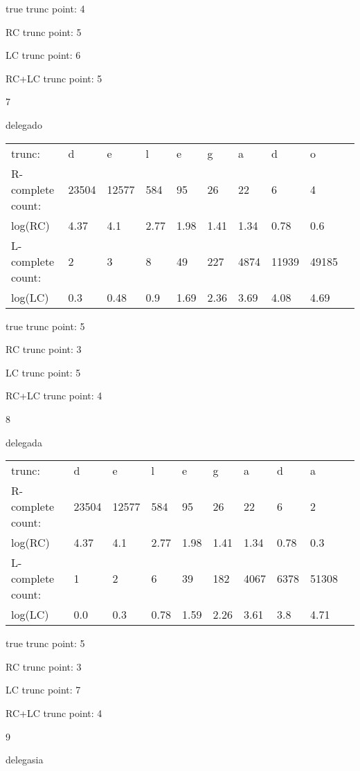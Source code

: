 \documentclass{article}
\begin{document}
true trunc point: 4

RC trunc point: 5

LC trunc point: 6

RC+LC trunc point: 5

\vspace{1em}

7

delegado

\begin{tabular}{l|lllllllll}
trunc: & d & e & l & e & g & a & d & o & \\ 
R-complete count: & 23504 & 12577 & 584 & 95 & 26 & 22 & 6 & 4 & \\ 
log(RC) & 4.37 & 4.1 & 2.77 & 1.98 & 1.41 & 1.34 & 0.78 & 0.6 & \\ 
L-complete count: & 2 & 3 & 8 & 49 & 227 & 4874 & 11939 & 49185 & \\ 
log(LC) & 0.3 & 0.48 & 0.9 & 1.69 & 2.36 & 3.69 & 4.08 & 4.69 & \\ 
\end{tabular}

true trunc point: 5

RC trunc point: 3

LC trunc point: 5

RC+LC trunc point: 4

\vspace{1em}

8

delegada

\begin{tabular}{l|lllllllll}
trunc: & d & e & l & e & g & a & d & a & \\ 
R-complete count: & 23504 & 12577 & 584 & 95 & 26 & 22 & 6 & 2 & \\ 
log(RC) & 4.37 & 4.1 & 2.77 & 1.98 & 1.41 & 1.34 & 0.78 & 0.3 & \\ 
L-complete count: & 1 & 2 & 6 & 39 & 182 & 4067 & 6378 & 51308 & \\ 
log(LC) & 0.0 & 0.3 & 0.78 & 1.59 & 2.26 & 3.61 & 3.8 & 4.71 & \\ 
\end{tabular}

true trunc point: 5

RC trunc point: 3

LC trunc point: 7

RC+LC trunc point: 4

\newpage

9

delegasia
\end{document}
